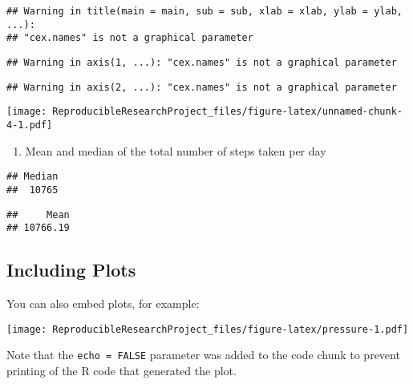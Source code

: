\documentclass[
]{article}
\newenvironment{Shaded}{\begin{snugshade}}{\end{snugshade}}
\newcommand{\DecValTok}[1]{\textcolor[rgb]{0.00,0.00,0.81}{#1}}
\newcommand{\KeywordTok}[1]{\textcolor[rgb]{0.13,0.29,0.53}{\textbf{#1}}}
\newcommand{\NormalTok}[1]{#1}
\newcommand{\OperatorTok}[1]{\textcolor[rgb]{0.81,0.36,0.00}{\textbf{#1}}}
\providecommand{\tightlist}{%
  \setlength{\itemsep}{0pt}\setlength{\parskip}{0pt}}
\begin{document}
\begin{verbatim}
## Warning in title(main = main, sub = sub, xlab = xlab, ylab = ylab, ...):
## "cex.names" is not a graphical parameter
\end{verbatim}

\begin{verbatim}
## Warning in axis(1, ...): "cex.names" is not a graphical parameter
\end{verbatim}

\begin{verbatim}
## Warning in axis(2, ...): "cex.names" is not a graphical parameter
\end{verbatim}

\texttt{[image: ReproducibleResearchProject\_files/figure-latex/unnamed-chunk-4-1.pdf]}

\begin{enumerate}
\def\labelenumi{\arabic{enumi}.}
\setcounter{enumi}{2}
\tightlist
\item
  Mean and median of the total number of steps taken per day
\end{enumerate}

\begin{Shaded}
\end{Shaded}

\begin{verbatim}
## Median 
##  10765
\end{verbatim}

\begin{Shaded}
\end{Shaded}

\begin{verbatim}
##     Mean 
## 10766.19
\end{verbatim}

\hypertarget{including-plots}{%
\subsection{Including Plots}\label{including-plots}}

You can also embed plots, for example:

\texttt{[image: ReproducibleResearchProject\_files/figure-latex/pressure-1.pdf]}

Note that the \texttt{echo\ =\ FALSE} parameter was added to the code
chunk to prevent printing of the R code that generated the plot.
\end{document}
